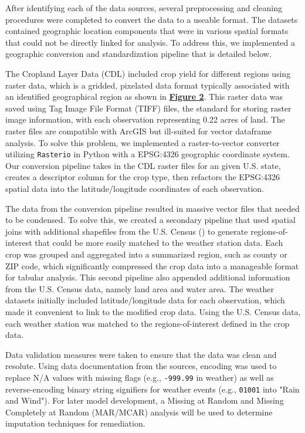 \documentclass{article}
\begin{document}
\hspace{.5cm}After identifying each of the data sources, several preprocessing and cleaning procedures were completed to convert the data to a useable format. The datasets contained geographic location components that were in various spatial formats that could not be directly linked for analysis.  To address this, we implemented a geographic conversion and standardization pipeline that is detailed below.

The Cropland Layer Data (CDL) included crop yield for different regions using raster data, which is a gridded, pixelated data format typically associated with an identified geographical region as shown in \textbf{\hyperref[sec:raster]{Figure 2}}. This raster data was saved using Tag Image File Format (TIFF) files, the standard for storing raster image information, with each observation representing 0.22 acres of land. The raster files are compatible with ArcGIS but ill-suited for vector dataframe analysis. To solve this problem, we implemented a raster-to-vector converter utilizing \texttt{Rasterio} in Python with a EPSG:4326 geographic coordinate system. Our conversion pipeline takes in the CDL raster files for an given U.S. state, creates a descriptor column for the crop type, then refactors the EPSG:4326 spatial data into the latitude/longitude coordinates of each observation. 

The data from the conversion pipeline resulted in massive vector files that needed to be condensed. To solve this, we created a secondary pipeline that used spatial joins with additional shapefiles from the U.S. Census (\citeyear{TIGER}) to generate regions-of-interest that could be more easily matched to the weather station data. Each crop was grouped and aggregated into a summarized region, such as county or ZIP code, which significantly compressed the crop data into a manageable format for tabular analysis. This second pipeline also appended additional information from the U.S. Census data, namely land area and water area. The weather datasets initially included latitude/longitude data for each observation, which made it convenient to link to the modified crop data. Using the U.S. Census data, each weather station was matched to the regions-of-interest defined in the crop data. 

Data validation measures were taken to ensure that the data was clean and  resolute. Using data documentation from the sources, encoding was used to replace N/A values with missing flags (e.g., \texttt{-999.99} in weather) as well as  reverse-encoding binary string signifiers for weather events (e.g., \texttt{01001} into "Rain and Wind"). For later model development, a Missing at Random and Missing Completely at Random (MAR/MCAR) analysis will be used to determine imputation techniques for remediation.
\end{document}
